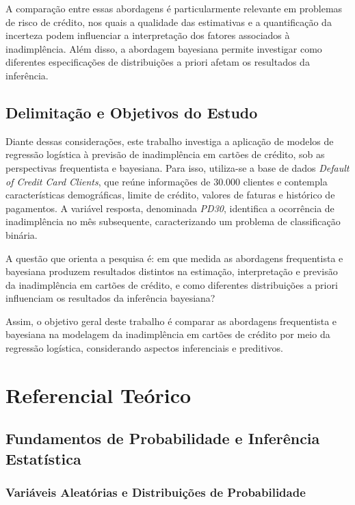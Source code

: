 \documentclass[
  brazilian,
  12pt,
  letterpaper,
  DIV=11,
  numbers=noendperiod]{scrartcl}
\begin{document}
A comparação entre essas abordagens é particularmente relevante em
problemas de risco de crédito, nos quais a qualidade das estimativas e a
quantificação da incerteza podem influenciar a interpretação dos fatores
associados à inadimplência. Além disso, a abordagem bayesiana permite
investigar como diferentes especificações de distribuições a priori
afetam os resultados da inferência.

\subsection{Delimitação e Objetivos do
Estudo}\label{delimitauxe7uxe3o-e-objetivos-do-estudo}

Diante dessas considerações, este trabalho investiga a aplicação de
modelos de regressão logística à previsão de inadimplência em cartões de
crédito, sob as perspectivas frequentista e bayesiana. Para isso,
utiliza-se a base de dados \emph{Default of Credit Card Clients}, que
reúne informações de 30.000 clientes e contempla características
demográficas, limite de crédito, valores de faturas e histórico de
pagamentos. A variável resposta, denominada \emph{PD30}, identifica a
ocorrência de inadimplência no mês subsequente, caracterizando um
problema de classificação binária.

A questão que orienta a pesquisa é: em que medida as abordagens
frequentista e bayesiana produzem resultados distintos na estimação,
interpretação e previsão da inadimplência em cartões de crédito, e como
diferentes distribuições a priori influenciam os resultados da
inferência bayesiana?

Assim, o objetivo geral deste trabalho é comparar as abordagens
frequentista e bayesiana na modelagem da inadimplência em cartões de
crédito por meio da regressão logística, considerando aspectos
inferenciais e preditivos.

\section{Referencial Teórico}\label{referencial-teuxf3rico}

\subsection{Fundamentos de Probabilidade e Inferência
Estatística}\label{fundamentos-de-probabilidade-e-inferuxeancia-estatuxedstica}

\subsubsection{Variáveis Aleatórias e Distribuições de
Probabilidade}\label{variuxe1veis-aleatuxf3rias-e-distribuiuxe7uxf5es-de-probabilidade}
\end{document}
